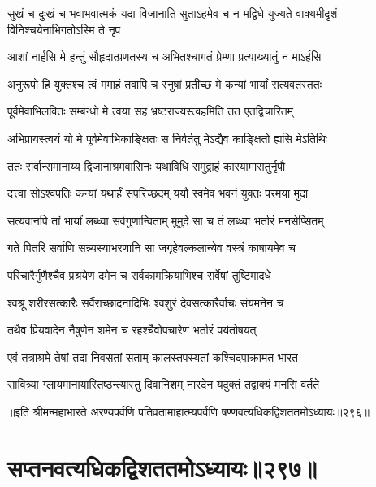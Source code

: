 


\fourlineindentedshloka
{सुखं च दुःखं च भवाभवात्मकं}
{यदा विजानाति सुताऽहमेव च}
{न मद्विधे युज्यते वाक्यमीदृशं}
{विनिश्चयेनाभिगतोऽस्मि ते नृप}


\twolineshloka
{आशां नार्हसि मे हन्तुं सौहृदात्प्रणतस्य च}
{अभितश्चागतं प्रेम्णा प्रत्याख्यातुं न माऽर्हसि}


\twolineshloka
{अनुरूपो हि युक्तश्च त्वं ममाहं तवापि च}
{स्नुषां प्रतीच्छ मे कन्यां भार्यां सत्यवतस्ततः}




\twolineshloka
{पूर्वमेवाभिलवितः सम्बन्धो मे त्वया सह}
{भ्रष्टराज्यस्त्वहमिति तत एतद्विचारितम्}


\twolineshloka
{अभिप्रायस्त्वयं यो मे पूर्वमेवाभिकाङ्क्षितः}
{स निर्वर्ततु मेऽद्यैव काङ्क्षितो ह्यसि मेऽतिथिः}


\twolineshloka
{ततः सर्वान्समानाय्य द्विजानाश्रमवासिनः}
{यथाविधि समुद्वाहं कारयामासतुर्नृपौ}


\twolineshloka
{दत्त्वा सोऽश्वपतिः कन्यां यथार्हं सपरिच्छदम्}
{ययौ स्वमेव भवनं युक्तः परमया मुदा}


\twolineshloka
{सत्यवानपि तां भार्यां लब्ध्वा सर्वगुणान्विताम्}
{मुमुदे सा च तं लब्ध्वा भर्तारं मनसेप्सितम्}


\twolineshloka
{गते पितरि सर्वाणि सन्न्यस्याभरणानि सा}
{जगृहेवल्कलान्येव वस्त्रं काषायमेव च}


\twolineshloka
{परिचारैर्गुणैश्चैव प्रश्रयेण दमेन च}
{सर्वकामक्रियाभिश्च सर्वेषां तुष्टिमादधे}


\twolineshloka
{श्वश्रूं शरीरसत्कारैः सर्वैराच्छादनादिभिः}
{श्वशुरं देवसत्कारैर्वाचः संयमनेन च}


\twolineshloka
{तथैव प्रियवादेन नैषुणेन शमेन च}
{रहश्चैवोपचारेण भर्तारं पर्यतोषयत्}


\twolineshloka
{एवं तत्राश्रमे तेषां तदा निवसतां सताम्}
{कालस्तपस्यतां कश्चिदपाक्रामत भारत}


\twolineshloka
{सावित्र्या ग्लायमानायास्तिष्ठन्त्यास्तु दिवानिशम्}
{नारदेन यदुक्तं तद्वाक्यं मनसि वर्तते}


॥इति श्रीमन्महाभारते अरण्यपर्वणि पतिव्रतामाहात्म्यपर्वणि षण्णवत्यधिकद्विशततमोऽध्यायः॥२९६॥


\chapter{सप्तनवत्यधिकद्विशततमोऽध्यायः॥२९७॥}


